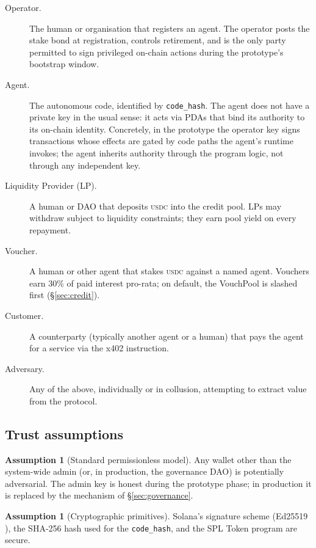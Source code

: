 \documentclass[10pt,conference,letterpaper]{IEEEtran}
\theoremstyle{definition}
\newtheorem{assumption}[theorem]{Assumption}
\newcommand{\codehash}{\texttt{code\_hash}}
\newcommand{\USDC}{\textsc{usdc}}
\begin{document}
\begin{description}
\item[Operator.] The human or organisation that registers an agent.
The operator posts the stake bond at registration, controls retirement,
and is the only party permitted to sign privileged on-chain actions
during the prototype's bootstrap window.

\item[Agent.] The autonomous code, identified by \codehash. The agent
does not have a private key in the usual sense: it acts via PDAs that
bind its authority to its on-chain identity. Concretely, in the
prototype the operator key signs transactions whose effects are gated
by code paths the agent's runtime invokes; the agent inherits authority
through the program logic, not through any independent key.

\item[Liquidity Provider (LP).] A human or DAO that deposits \USDC{}
into the credit pool. LPs may withdraw subject to liquidity constraints;
they earn pool yield on every repayment.

\item[Voucher.] A human or other agent that stakes \USDC{} against a
named agent. Vouchers earn 30\% of paid interest pro-rata; on default,
the VouchPool is slashed first (\S\ref{sec:credit}).

\item[Customer.] A counterparty (typically another agent or a human)
that pays the agent for a service via the x402 instruction.

\item[Adversary.] Any of the above, individually or in collusion,
attempting to extract value from the protocol.
\end{description}

\subsection{Trust assumptions}

\begin{assumption}[Standard permissionless model]\label{ass:perm}
Any wallet other than the system-wide admin (or, in production, the
governance DAO) is potentially adversarial. The admin key is honest
during the prototype phase; in production it is replaced by the
mechanism of \S\ref{sec:governance}.
\end{assumption}

\begin{assumption}[Cryptographic primitives]\label{ass:crypto}
Solana's signature scheme (Ed25519 \cite{ed25519}), the SHA-256 hash
used for the \codehash, and the SPL Token program \cite{splToken} are
secure.
\end{assumption}
\end{document}
